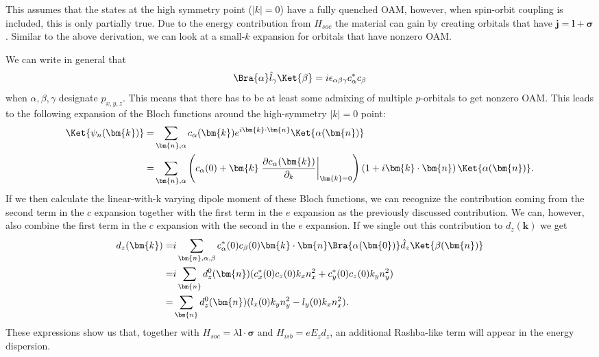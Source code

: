 This assumes that the states at the high symmetry point ($|k|=0$) have a fully quenched OAM, however, when spin-orbit coupling is included, this is only partially true. Due to the energy contribution from $H_{soc}$ the material can gain by creating orbitals that have $\bm{j} = \bm{l} + \bm{\sigma}$. Similar to the above derivation, we can look at a small-$k$ expansion for orbitals that have nonzero OAM.

We can write in general that
\begin{equation}
	\Bra{\alpha} \hat{l}_{\gamma} \Ket{\beta} = i \epsilon_{\alpha \beta \gamma} c^*_\alpha c_\beta
\end{equation}
when $\alpha,\beta,\gamma$ designate $p_{x,y,z}$. This means that there has to be at least some admixing of multiple $p$-orbitals to get nonzero OAM. This leads to the following expansion of the Bloch functions around the high-symmetry $|k|=0$ point:
\begin{align}
	\Ket{\psi_n(\bm{k})} =& \sum_{\bm{n},\alpha} c_\alpha(\bm{k}) e^{i \bm{k}\cdot\bm{n}}\Ket{\alpha(\bm{n})}\\
	=& \sum_{\bm{n},\alpha} \left(c_\alpha(0) + \bm{k}\left.\frac{\partial c_\alpha(\bm{k})}{\partial_k}\right\rvert_{\bm{k}=0} \right)\left(1 + i\bm{k}\cdot\bm{n}\right)\Ket{\alpha(\bm{n})} .
\end{align}
If we then calculate the linear-with-k varying dipole moment of these Bloch functions, we can recognize the contribution coming from the second term in the $c$ expansion together with the first term in the $e$ expansion as the previously discussed contribution. We can, however, also combine the first term in the $c$ expansion with the second in the $e$ expansion. If we single out this contribution to $d_z(\bm{k})$ we get
\begin{align}
	\label{eq:d_z_from_OAM}
	d_z(\bm{k}) =&  i\sum_{\bm{n},\alpha,\beta} c_\alpha^*(0)c_\beta(0)\bm{k}\cdot\bm{n}\Bra{\alpha(\bm{0})} \hat{d}_z \Ket{\beta(\bm{n})}\\
	=&i\sum_{\bm{n}} d^0_z(\bm{n}) (c^*_x(0)c_z(0)k_x n_x^2 + c^*_y(0)c_z(0) k_y n_y^2) \\
	=&\sum_{\bm{n}} d^0_z(\bm{n}) (l_x(0)k_y n_y^2-l_y(0) k_x n_x^2).
\end{align}
These expressions show us that, together with $H_{soc} = \lambda \bm{l}\cdot\bm{\sigma}$ and $H_{isb} = e E_z d_z$, an additional Rashba-like term will appear in the energy dispersion.

